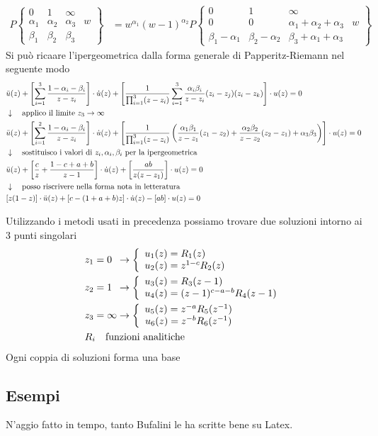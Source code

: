 \begin{align}
	P\left\{\begin{matrix}
		0 & 1 & \infty & \\
		\alpha_1 & \alpha_2 & \alpha_3& w\\
		\beta_1 & \beta_2 & \beta_3 & 
	\end{matrix}\right\} &= w^{\alpha_1}(w-1)^{\alpha_2}P\left\{\begin{matrix}
		0 & 1 & \infty & \\
		0 & 0 &  \alpha_1 + \alpha_2 + \alpha_3& w\\
		\beta_1-\alpha_1 & \beta_2-\alpha_2 & \beta_3 + \alpha_1  + \alpha_3& 
	\end{matrix}\right\}
\end{align}
Si può ricaare l'ipergeometrica dalla forma generale di Papperitz-Riemann nel seguente modo
\begin{align}
	&\ddot{u}(z) + \left[\sum_{i=1}^3\frac{1-\alpha_i - \beta_i}{z-z_i}\right]\cdot \dot{u}(z) + \left[\frac{1}{\prod_{i=1}^3(z-z_i)}\sum_{i=1}^3\frac{\alpha_i\beta_i}{z-z_i}(z_i-z_j)(z_i-z_k)\right] \cdot u(z)=0\\ &\downarrow \quad \text{applico il limite $z_3 \rightarrow \infty$} \nonumber \\	
	&\ddot{u}(z) + \left[\sum_{i=1}^2\frac{1-\alpha_i - \beta_i}{z-z_i}\right]\cdot \dot{u}(z) + \left[\frac{1}{\prod_{i=1}^3(z-z_i)}\left(\frac{\alpha_1\beta_1}{z-z_1}(z_1-z_2) + \frac{\alpha_2\beta_2}{z-z_2}(z_2-z_1) + \alpha_3\beta_3\right)\right] \cdot u(z)=0\nonumber \\ &\downarrow \quad \text{sostituisco i valori di $z_i,\alpha_i,\beta_i$ per la ipergeometrica} \nonumber \\
	&\ddot{u}(z) + \left[\frac{c}{z} + \frac{1-c+a+b}{z-1}\right]\cdot \dot{u}(z) + \left[\frac{ab}{z(z-z_1)}\right] \cdot u(z)=0\nonumber \\ &\downarrow \quad \text{posso riscrivere nella forma nota in letteratura} \nonumber \\
	&[z(1-z)]\cdot \ddot{u}(z)  + [c-(1+a+b)z] \cdot \dot{u}(z) - [ab]\cdot u(z) = 0
\end{align}

\newpage
{}
Utilizzando i metodi usati in precedenza possiamo trovare due soluzioni intorno ai 3 punti singolari
\begin{align}
	&z_1 = 0 \;\: \to \double{u_1(z) = R_1(z)\hfill}  	       {u_2(z) = z^{1-c}R_2(z)}\\
	&z_2 = 1 \;\: \to \double{u_3(z) = R_3(z-1)\hfill}         {u_4(z) = (z-1)^{c-a-b}R_4(z-1)}\\
	&z_3 = \infty \to \double{u_5(z) = z^{-a}R_5(z^{-1})\hfill}{u_6(z) = z^{-b}R_6(z^{-1})}\\
	&R_i \quad \text{funzioni analitiche}	
\end{align}
Ogni coppia di soluzioni forma una base

\newpage
\subsection{Esempi}
N'aggio fatto in tempo, tanto Bufalini le ha scritte bene su Latex.